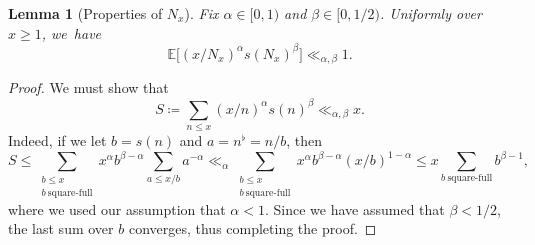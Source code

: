 \documentclass[10pt,a4paper]{article}
\newcommand{\EE}{\mathbb{E}}
\newcommand{\bg}{\big}
\theoremstyle{plain}
\newtheorem{lem}[cor]{Lemma}
\theoremstyle{definition}
\begin{document}
\begin{lem}[Properties of $N_x$]
\label{lem:properties of N}
Fix $\alpha\in[0,1)$ and $\beta\in[0,1/2)$. Uniformly over $x\ge1$, we~have
\[
\EE\bg[(x/N_x)^\alpha s(N_x)^\beta\bg] \ll_{\alpha,\beta} 1.
\]
\end{lem}

\begin{proof} We must show that
\[
S\coloneqq \sum_{n \le x} (x/n)^\alpha s(n)^\beta\ll_{\alpha,\beta} x.
\]
Indeed, if we let $b=s(n)$ and $a=n^\flat=n/b$, then
\[
S\le \sum_{\substack{b\le x \\ b\ \text{square-full} }} x^\alpha b^{\beta-\alpha} \sum_{a\le x/b} a^{-\alpha}
\ll_\alpha \sum_{\substack{b\le x \\ b\ \text{square-full} }} x^\alpha b^{\beta-\alpha} (x/b)^{1-\alpha}
\le x \sum_{b\ \text{square-full} } b^{\beta-1},
\]
where we used our assumption that $\alpha<1$.
Since we have assumed that $\beta<1/2$, the last sum over $b$ converges, thus completing the proof.
\end{proof}
\end{document}
